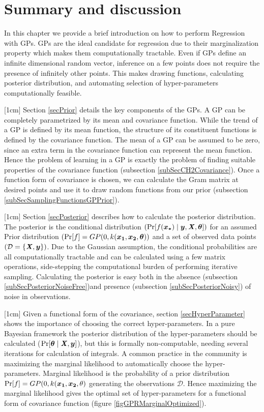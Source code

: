 \section{Summary and discussion}\label{secCH2Discussion}
In this chapter we provide a brief introduction on how to perform Regression with GPs. GPs are the ideal candidate for regression due to their marginalization property which makes them computationally tractable. Even if GPs define an infinite dimensional random vector, inference on a few points does not require the presence of infinitely other points. This makes drawing functions, calculating posterior distribution, and automating selection of hyper-parameters computationally feasible.  

[1cm]
Section \ref{secPrior} details the key components of the GPs. A GP can be completely parametrized by its mean and covariance function. While the trend of a GP is defined by its mean function, the structure of its constituent functions is defined by the covariance function. The mean of a GP can be assumed to be zero, since an extra term in the covariance function can represent the mean function. Hence the problem of learning in a GP is exactly the problem of finding suitable properties of the covariance function (subsection \ref{subSecCH2Covariance}). Once a function form of covariance is chosen, we can calculate the Gram matrix at desired points and use it to draw random functions from our prior (subsection \ref{subSecSamplingFunctionsGPPrior}). 

[1cm]
Section \ref{secPosterior} describes how to calculate the posterior distribution. The posterior is the conditional distribution $(\Pr[f(\boldsymbol{x_{*}}) \mid \boldsymbol{y}, \bm{\mathit{X}}, \boldsymbol{\theta}])$ for an assumed Prior distribution $(\Pr[f] = GP(0, k(\boldsymbol{x_1}, \boldsymbol{x_2}, \boldsymbol{\theta}))$ and a set of observed data points $(\mathcal{D} = \{\bm{\mathit{X}}, \boldsymbol{y}\})$. Due to the Gaussian assumption, the conditional probabilities are all computationally tractable and can be calculated using a few matrix operations, side-stepping the computational burden of performing iterative sampling. Calculating the posterior is easy both in the absence (subsection \ref{subSecPosteriorNoiseFree})and presence (subsection \ref{subSecPosteriorNoisy}) of noise in observations. 

[1cm]
Given a functional form of the covariance, section \ref{secHyperParameter} shows the importance of choosing the correct hyper-parameters. In a pure Bayesian framework the posterior distribution of the hyper-parameters should be calculated ($\Pr[\boldsymbol{\theta} \mid \bm{\mathit{X}}, \boldsymbol{y}]$), but this is formally non-computable, needing several iterations for calculation of integrals. A common practice in the community is maximizing the marginal likelihood to automatically choose the hyper-parameters. Marginal likelihood is the probability of a prior distribution $\Pr[f] = GP(0, k(\boldsymbol{x_1}, \boldsymbol{x_2}, \theta)$ generating the observations $\mathcal{D}$. Hence maximizing the marginal likelihood gives the optimal set of hyper-parameters for a functional form of covariance function (figure \ref{figGPRMarginalOptimized}). 

